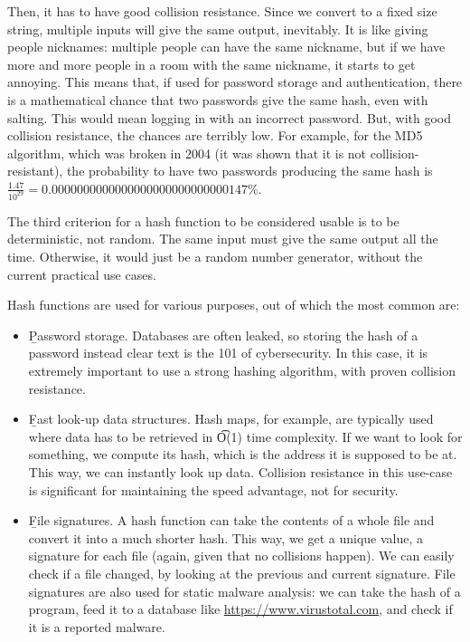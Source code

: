 Then, it has to have good collision resistance.
Since we convert to a fixed size string, multiple inputs will give the same output, inevitably.
It is like giving people nicknames: multiple people can have the same nickname, but if we have more and more people in a room with the same nickname, it starts to get annoying.
This means that, if used for password storage and authentication, there is a mathematical chance that two passwords give the same hash, even with salting.
This would mean logging in with an incorrect password.
But, with good collision resistance, the chances are terribly low.
For example, for the MD5 algorithm, which was broken in 2004 (it was shown that it is not collision-resistant), the probability to have two passwords producing the same hash is $\frac{1.47}{10^{29}} = 0.0000000000000000000000000000147\%$\cite{two-passwords-same-hash}.

The third criterion for a hash function to be considered usable is to be deterministic, not random.
The same input must give the same output all the time.
Otherwise, it would just be a random number generator, without the current practical use cases.

Hash functions are used for various purposes, out of which the most common are:
\begin{itemize}
    \item \b{Password storage}.
        Databases are often leaked, so storing the hash of a password instead clear text is the 101 of cybersecurity.
        In this case, it is extremely important to use a strong hashing algorithm, with proven collision resistance.
    \item \b{Fast look-up data structures}.
        Hash maps, for example, are typically used where data has to be retrieved in \t{O(1)} time complexity.
        If we want to look for something, we compute its hash, which is the address it is supposed to be at.
        This way, we can instantly look up data.
        Collision resistance in this use-case is significant for maintaining the speed advantage, not for security.
    \item \b{File signatures}.
        A hash function can take the contents of a whole file and convert it into a much shorter hash.
        This way, we get a unique value, a signature for each file (again, given that no collisions happen).
        We can easily check if a file changed, by looking at the previous and current signature.
        File signatures are also used for static malware analysis: we can take the hash of a program, feed it to a database like \url{https://www.virustotal.com}, and check if it is a reported malware.
\end{itemize}

